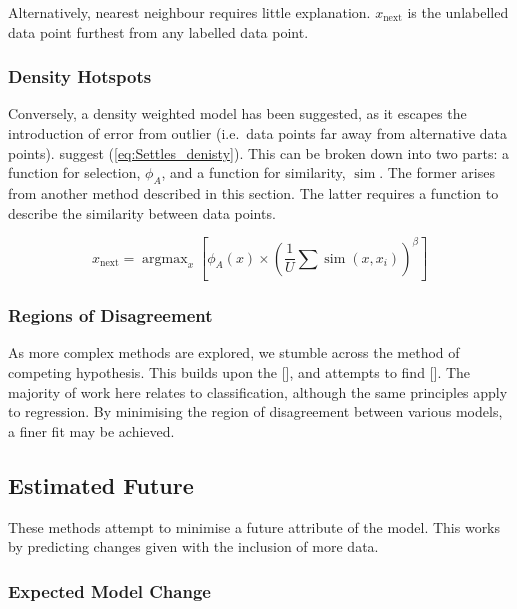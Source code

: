 \documentclass[a4paper, english]{report}
\DeclareMathOperator*{\argmax}{argmax}
\DeclareMathOperator*{\simm}{sim}
\begin{document}
Alternatively, nearest neighbour requires little explanation. $x_\mathrm{next}$ is the unlabelled data point furthest from any labelled data point.

\subsubsection{Density Hotspots}
Conversely, a density weighted model has been suggested, as it escapes the introduction of error from outlier (i.e.\ data points far away from alternative data points). \textcite{Settles_2008} suggest (\ref{eq:Settles_denisty}). This can be broken down into two parts: a function for selection, $\phi_A$, and a function for similarity, $\simm$. The former arises from  another method described in this section. The latter requires a function to describe the similarity between data points.

\begin{equation}
    \label{eq:Settles_denisty}
    x_\mathrm{next}=\argmax_x{\left[\phi_A(x)\times{\left(\frac{1}{U}\sum{\simm{(x, x_i)}}\right)}^\beta\right]}
\end{equation}

\subsubsection{Regions of Disagreement}
As more complex methods are explored, we stumble across the method of competing hypothesis. This builds upon the [], and attempts to find []. The majority of work here relates to classification, although the same principles apply to regression. By minimising the region of disagreement between various models, a finer fit may be achieved.

\subsection{Estimated Future}
These methods attempt to minimise a future attribute of the model. This works by predicting changes given with the inclusion of more data.

\subsubsection{Expected Model Change}
\end{document}
